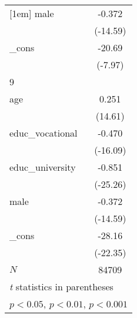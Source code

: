 {\begin{tabular}{l*{1}{c}}
[1em]
male        &      -0.372\sym{***}\\
            &    (-14.59)         \\
[1em]
\_cons      &      -20.69\sym{***}\\
            &     (-7.97)         \\
\hline
9           &                     \\
age         &       0.251\sym{***}\\
            &     (14.61)         \\
[1em]
educ\_vocational&      -0.470\sym{***}\\
            &    (-16.09)         \\
[1em]
educ\_university&      -0.851\sym{***}\\
            &    (-25.26)         \\
[1em]
male        &      -0.372\sym{***}\\
            &    (-14.59)         \\
[1em]
\_cons      &      -28.16\sym{***}\\
            &    (-22.35)         \\
\hline
\(N\)       &       84709         \\
\hline\hline
\multicolumn{2}{l}{\footnotesize \textit{t} statistics in parentheses}\\
\multicolumn{2}{l}{\footnotesize \sym{*} \(p<0.05\), \sym{**} \(p<0.01\), \sym{***} \(p<0.001\)}\\
\end{tabular}
}
